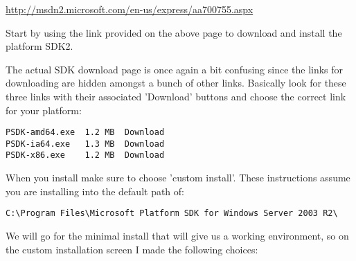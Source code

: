 \url{http://msdn2.microsoft.com/en-us/express/aa700755.aspx}

Start by using the link provided on the above page to download and install the
platform SDK2.

The actual SDK download page is once again a bit confusing since the links for 
downloading are hidden amongst a bunch of other links. Basically look for these 
three links with their associated 'Download' buttons and choose the correct 
link for your platform:

\begin{verbatim}
PSDK-amd64.exe  1.2 MB  Download 
PSDK-ia64.exe   1.3 MB  Download 
PSDK-x86.exe    1.2 MB  Download
\end{verbatim}

When you install make sure to choose 'custom install'. These instructions 
assume you are installing into the default path of:

\begin{verbatim}
C:\Program Files\Microsoft Platform SDK for Windows Server 2003 R2\
\end{verbatim}

We will go for the minimal install that will give us a working environment, 
so on the custom installation screen I made the following choices:


